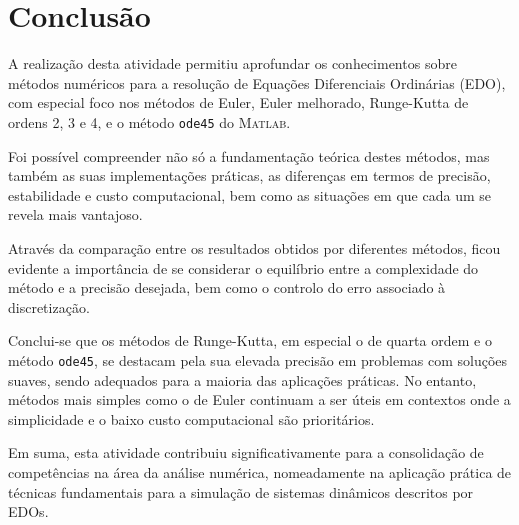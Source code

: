 
\chapter{Conclusão}

A realização desta atividade permitiu aprofundar os conhecimentos sobre métodos numéricos para a resolução de Equações Diferenciais Ordinárias (EDO), com especial foco nos métodos de Euler, Euler melhorado, Runge-Kutta de ordens 2, 3 e 4, e o método \texttt{ode45} do \textsc{Matlab}.

Foi possível compreender não só a fundamentação teórica destes métodos, mas também as suas implementações práticas, as diferenças em termos de precisão, estabilidade e custo computacional, bem como as situações em que cada um se revela mais vantajoso. 

Através da comparação entre os resultados obtidos por diferentes métodos, ficou evidente a importância de se considerar o equilíbrio entre a complexidade do método e a precisão desejada, bem como o controlo do erro associado à discretização.

Conclui-se que os métodos de Runge-Kutta, em especial o de quarta ordem e o método \texttt{ode45}, se destacam pela sua elevada precisão em problemas com soluções suaves, sendo adequados para a maioria das aplicações práticas. No entanto, métodos mais simples como o de Euler continuam a ser úteis em contextos onde a simplicidade e o baixo custo computacional são prioritários.

Em suma, esta atividade contribuiu significativamente para a consolidação de competências na área da análise numérica, nomeadamente na aplicação prática de técnicas fundamentais para a simulação de sistemas dinâmicos descritos por EDOs.
